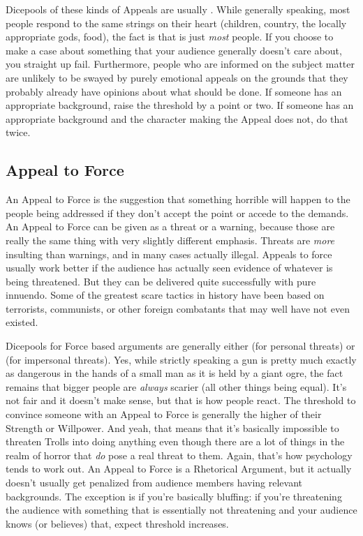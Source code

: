 Dicepools of these kinds of Appeals are usually . While generally speaking, most people respond to the same strings on their heart (children, country, the locally appropriate gods, food), the fact is that is just \textit{most} people. If you choose to make a case about something that your audience generally doesn't care about, you straight up fail. Furthermore, people who are informed on the subject matter are unlikely to be swayed by purely emotional appeals on the grounds that they probably already have opinions about what should be done. If someone has an appropriate background, raise the threshold by a point or two. If someone has an appropriate background and the character making the Appeal does not, do that twice.

\subsection{Appeal to Force}

An Appeal to Force is the suggestion that something horrible will happen to the people being addressed if they don't accept the point or accede to the demands. An Appeal to Force can be given as a threat or a warning, because those are really the same thing with very slightly different emphasis. Threats are \textit{more} insulting than warnings, and in many cases actually illegal. Appeals to force usually work better if the audience has actually seen evidence of whatever is being threatened. But they can be delivered quite successfully with pure innuendo. Some of the greatest scare tactics in history have been based on terrorists, communists, or other foreign combatants that may well have not even existed.

Dicepools for Force based arguments are generally either  (for personal threats) or  (for impersonal threats). Yes, while strictly speaking a gun is pretty much exactly as dangerous in the hands of a small man as it is held by a giant ogre, the fact remains that bigger people are \textit{always} scarier (all other things being equal). It's not fair and it doesn't make sense, but that is how people react. The threshold to convince someone with an Appeal to Force is generally the higher of their Strength or Willpower. And yeah, that means that it's basically impossible to threaten Trolls into doing anything even though there are a lot of things in the realm of horror that \textit{do} pose a real threat to them. Again, that's how psychology tends to work out. An Appeal to Force is a Rhetorical Argument, but it actually doesn't usually get penalized from audience members having relevant backgrounds. The exception is if you're basically bluffing: if you're threatening the audience with something that is essentially not threatening and your audience knows (or believes) that, expect threshold increases.

